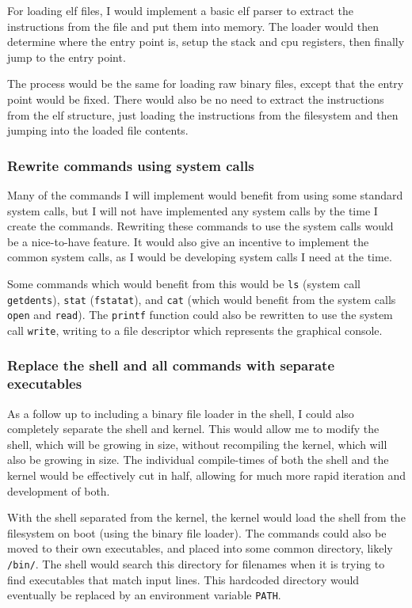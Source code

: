 \documentclass{article}
\begin{document}
For loading \gls{elf} files, I would implement a basic \gls{elf} parser to
extract the instructions from the file and put them into memory. The loader
would then determine where the entry point is, setup the stack and \gls{cpu}
registers, then finally jump to the entry point.

The process would be the same for loading raw binary files, except that the
entry point would be fixed. There would also be no need to extract the
instructions from the \gls{elf} structure, just loading the instructions from
the filesystem and then jumping into the loaded file contents.

\subsubsection{Rewrite commands using system calls}
Many of the commands I will implement would benefit from using some standard
system calls, but I will not have implemented any system calls by the time I
create the commands. Rewriting these commands to use the system calls would be
a nice-to-have feature. It would also give an incentive to implement the
common system calls, as I would be developing system calls I need at the time.

Some commands which would benefit from this would be \texttt{ls} (system call
\texttt{getdents}), \texttt{stat} (\texttt{fstatat}), and \texttt{cat} (which
would benefit from the system calls \texttt{open} and \texttt{read}). The
\texttt{printf} function could also be rewritten to use the system call
\texttt{write}, writing to a file descriptor which represents the graphical
console.

\subsubsection{Replace the shell and all commands with separate executables}
As a follow up to including a binary file loader in the shell, I could also
completely separate the shell and kernel. This would allow me to modify the
shell, which will be growing in size, without recompiling the kernel, which
will also be growing in size. The individual compile-times of both the shell
and the kernel would be effectively cut in half, allowing for much more rapid
iteration and development of both.

With the shell separated from the kernel, the kernel would load the shell from
the filesystem on boot (using the binary file loader). The commands could also
be moved to their own executables, and placed into some common directory,
likely \texttt{/bin/}. The shell would search this directory for filenames when
it is trying to find executables that match input lines. This hardcoded
directory would eventually be replaced by an environment variable
\texttt{PATH}.
\end{document}
